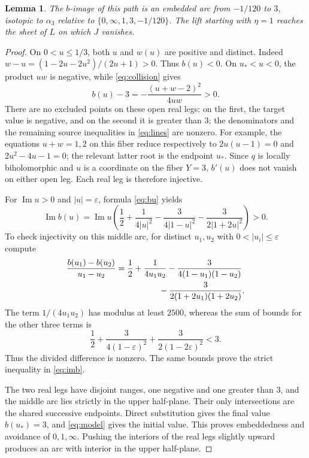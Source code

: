 \documentclass[11pt]{article}
\newtheorem{lemma}[theorem]{Lemma}
\theoremstyle{remark}
\begin{document}
\begin{lemma}\label{lem:arc}
The $b$-image of this path is an embedded arc from $-1/120$ to $3$, isotopic to $\alpha_3$ relative to $\{0,\infty,1,3,-1/120\}$. The lift starting with $\eta=1$ reaches the sheet of $L$ on which $J$ vanishes.
\end{lemma}
\begin{proof}
On $0<u\leq1/3$, both $u$ and $w(u)$ are positive and distinct. Indeed $w-u=(1-2u-2u^2)/(2u+1)>0$. Thus $b(u)<0$. On $u_*<u<0$, the product $uw$ is negative, while \eqref{eq:collision} gives
\[
 b(u)-3=-\frac{(u+w-2)^2}{4uw}>0.
\]
There are no excluded points on these open real legs: on the first, the target value is negative, and on the second it is greater than $3$; the denominators and the remaining source inequalities in \eqref{eq:lines} are nonzero. For example, the equations $u+w=1,2$ on this fiber reduce respectively to $2u(u-1)=0$ and $2u^2-4u-1=0$; the relevant latter root is the endpoint $u_*$. Since $q$ is locally biholomorphic and $u$ is a coordinate on the fiber $Y=3$, $b'(u)$ does not vanish on either open leg. Each real leg is therefore injective.

For $\operatorname{Im}u>0$ and $|u|=\varepsilon$, formula \eqref{eq:bu} yields
\begin{equation}\label{eq:imb}
 \operatorname{Im}b(u)=\operatorname{Im}u\left(
 \frac12+\frac1{4|u|^2}-\frac3{4|1-u|^2}
                  -\frac3{2|1+2u|^2}\right)>0.
\end{equation}
To check injectivity on this middle arc, for distinct $u_1,u_2$ with $0<|u_i|\leq\varepsilon$ compute
\begin{align}\label{eq:divdiff}
 \frac{b(u_1)-b(u_2)}{u_1-u_2}
 &=\frac12+\frac1{4u_1u_2}
   -\frac3{4(1-u_1)(1-u_2)}\nonumber\\
 &\hspace{18mm}-\frac3{2(1+2u_1)(1+2u_2)}.
\end{align}
The term $1/(4u_1u_2)$ has modulus at least $2500$, whereas the sum of bounds for the other three terms is
\[
 \frac12+\frac3{4(1-\varepsilon)^2}
          +\frac3{2(1-2\varepsilon)^2}<3.
\]
Thus the divided difference is nonzero. The same bounds prove the strict inequality in \eqref{eq:imb}.

The two real legs have disjoint ranges, one negative and one greater than $3$, and the middle arc lies strictly in the upper half-plane. Their only intersections are the shared successive endpoints. Direct substitution gives the final value $b(u_*)=3$, and \eqref{eq:model} gives the initial value. This proves embeddedness and avoidance of $0,1,\infty$. Pushing the interiors of the real legs slightly upward produces an arc with interior in the upper half-plane. 


\end{proof}
\end{document}
